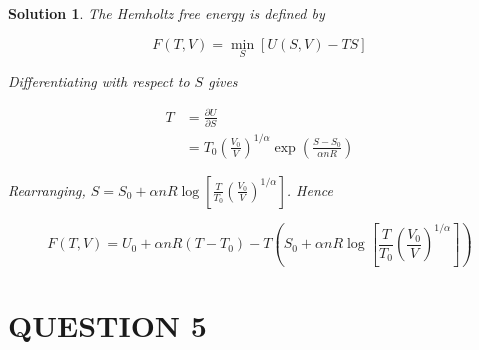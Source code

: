 \documentclass[a4paper]{article}
\newtheorem*{soln}{Solution}
\begin{document}
\begin{soln}
	The Hemholtz free energy is defined by 
	
	\[ F(T,V) = \min_{S}\left[ U(S,V) - TS \right]  \]
	
Differentiating with respect to $ S $ gives 

\begin{align*}
T & = \frac{\partial U }{\partial S}  \\
& = T_{0} \left( \frac{V_{0}}{V} \right)^{1/\alpha} \exp\left(   \frac{S - S_{0}}{\alpha n R}\right) 
\end{align*}

Rearranging, $ S = S_{0} + \alpha n R \log \left[ \frac{T}{T_{0}}  \left( \frac{V_{0}}{V} \right)^{1/\alpha} \right]  $. Hence

\[  F(T,V) = U_{0} + \alpha n R (T - T_{0}) - T \left(  S_{0} + \alpha n R \log \left[ \frac{T}{T_{0}}  \left( \frac{V_{0}}{V} \right)^{1/\alpha} \right] \right)  \]
\end{soln}

\section{QUESTION 5}
\end{document}
